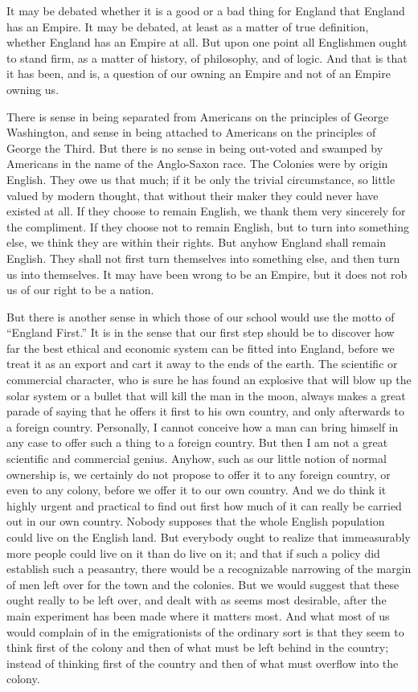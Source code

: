 \documentclass{book}
\begin{document}
It may be debated whether it is a good or a bad thing for England that England has an Empire. It may be debated, at least as a matter of true definition, whether England has an Empire at all. But upon one point all Englishmen ought to stand firm, as a matter of history, of philosophy, and of logic. And that is that it has been, and is, a question of our owning an Empire and not of an Empire owning us.

There is sense in being separated from Americans on the principles of George Washington, and sense in being attached to Americans on the principles of George the Third. But there is no sense in being out-voted and swamped by Americans in the name of the Anglo-Saxon race. The Colonies were by origin English. They owe us that much; if it be only the trivial circumstance, so little valued by modern thought, that without their maker they could never have existed at all. If they choose to remain English, we thank them very sincerely for the compliment. If they choose not to remain English, but to turn into something else, we think they are within their rights. But anyhow England shall remain English. They shall not first turn themselves into something else, and then turn us into themselves. It may have been wrong to be an Empire, but it does not rob us of our right to be a nation.

But there is another sense in which those of our school would use the motto of “England First.” It is in the sense that our first step should be to discover how far the best ethical and economic system can be fitted into England, before we treat it as an export and cart it away to the ends of the earth. The scientific or commercial character, who is sure he has found an explosive that will blow up the solar system or a bullet that will kill the man in the moon, always makes a great parade of saying that he offers it first to his own country, and only afterwards to a foreign country. Personally, I cannot conceive how a man can bring himself in any case to offer such a thing to a foreign country. But then I am not a great scientific and commercial genius. Anyhow, such as our little notion of normal ownership is, we certainly do not propose to offer it to any foreign country, or even to any colony, before we offer it to our own country. And we do think it highly urgent and practical to find out first how much of it can really be carried out in our own country. Nobody supposes that the whole English population could live on the English land. But everybody ought to realize that immeasurably more people could live on it than do live on it; and that if such a policy did establish such a peasantry, there would be a recognizable narrowing of the margin of men left over for the town and the colonies. But we would suggest that these ought really to be left over, and dealt with as seems most desirable, after the main experiment has been made where it matters most. And what most of us would complain of in the emigrationists of the ordinary sort is that they seem to think first of the colony and then of what must be left behind in the country; instead of thinking first of the country and then of what must overflow into the colony.
\end{document}
